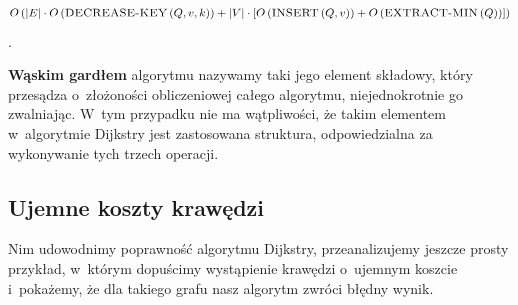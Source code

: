 \begin{equation}
O \left( \left| E \right| \cdot O \left( \textrm{\textsc{DECREASE-KEY}} \left( Q, v, k \right) \right) + \left| V \right| \cdot \left[ O \left( \textrm{\textsc{INSERT}} \left( Q, v \right) \right) + O \left( \textrm{\textsc{EXTRACT-MIN}} \left( Q \right) \right) \right] \right)
\end{equation}\label{eq:dijkstraComplexity}.

\textbf{Wąskim gardłem} algorytmu nazywamy taki jego element składowy, który przesądza o~złożoności obliczeniowej całego algorytmu, niejednokrotnie go zwalniając. W~tym przypadku nie ma wątpliwości, że takim elementem w~algorytmie Dijkstry jest zastosowana struktura, odpowiedzialna za wykonywanie tych trzech operacji.

\subsection{Ujemne koszty krawędzi}

Nim udowodnimy poprawność algorytmu Dijkstry, przeanalizujemy jeszcze prosty przykład, w~którym dopuścimy wystąpienie krawędzi o~ujemnym koszcie i~pokażemy, że dla takiego grafu nasz algorytm zwróci błędny wynik.

